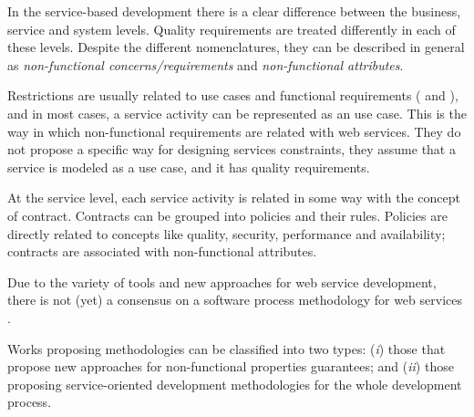  
   


In the service-based development there is a clear difference between the
business, service and system levels. Quality requirements are treated
differently in each of these levels. Despite the different nomenclatures, they
can be described in general as \textit{non-functional concerns/requirements} and
\textit{non-functional attributes}.
  
Restrictions are usually related to use cases and functional requirements
(\cite{ieee_1998} and \cite{sommerville08}), and in most cases, a service
activity can be represented as an use case. This is the way in which
non-functional requirements are related with web services. They do not propose a
specific way for designing services constraints, they assume that a service is
modeled as a use case, and it has quality requirements.

At the service level, each service activity is related in some way with the
concept of contract. Contracts can be grouped into policies and their
rules. Policies are directly related to concepts like quality,
security, performance and availability; contracts are associated with non-functional attributes. 

\bigskip
\bigskip

Due to the variety of tools and new approaches for web service development,
there is not (yet) a consensus on a software process methodology for web
services
\cite{PapazoglouH06,Papazoglou03,cdl2006,MilanovicM06,FeuerlichtM05,Ramollari_asurvey,somet2005}.
 
Works proposing methodologies can be
classified into two types: (\textit{i}) those that propose new approaches for non-functional
properties guarantees; and (\textit{ii}) those proposing service-oriented
development methodologies for the whole development process.
    
